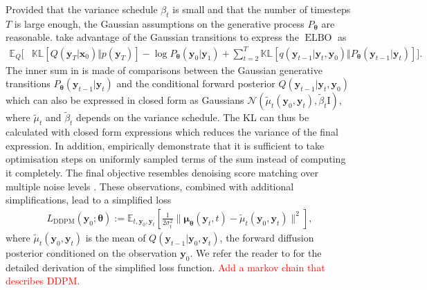 Provided that the variance schedule $\beta_t$ is small and that the number of timesteps $T$ is large enough, the Gaussian assumptions on the generative process $P_{\bm{\theta}}$ are reasonable. \citet{ho_denoising_2020} take advantage of the Gaussian transitions to express the $\operatorname{ELBO}$ as
\begin{align}
        \mathbb{E}_Q \biggl[& \mathbb{KL}\left[Q(\mathbf{y}_T|\mathbf{x}_0)\Vert p(\mathbf{y}_T)\right] - \log P_{\bm{\theta}}(\mathbf{y}_0|\mathbf{y}_1) + \sum_{t=2}^T \mathbb{KL}\left[q(\mathbf{y}_{t-1}|\mathbf{y}_t, \mathbf{y}_0)\Vert P_{\bm{\theta}}(\mathbf{y}_{t-1}|\mathbf{y}_t)\right]
     \biggr]. \label{eq:simple_DDPM_ELBO}
\end{align}
The inner sum in  is made of comparisons between the Gaussian generative transitions $P_{\bm{\theta}}(\mathbf{y}_{t-1}|\mathbf{y}_t)$ and the conditional forward posterior $Q(\mathbf{y}_{t-1}|\mathbf{y}_t, \mathbf{y}_0)$ which can also be expressed in closed form as Gaussians $\mathcal{N}(\tilde{\mu}_t(\mathbf{y}_0, \mathbf{y}_t), \tilde{\beta}_t \text{I})$, where $\tilde{\mu}_t$ and $\tilde{\beta}_t$ depends on the variance schedule. The KL can thus be calculated with closed form expressions which reduces the variance of the final expression.
In addition, \citet{ho_denoising_2020} empirically demonstrate that it is sufficient to take optimisation steps on uniformly sampled terms of the sum instead of computing it completely. The final objective resembles denoising score matching over multiple noise levels \citep{vincent2011connection}. These observations, combined with additional simplifications, lead to a simplified loss
\begin{align}
    L_\text{DDPM}(\mathbf{y}_0; \bm{\theta}) := \mathbb{E}_{t, \mathbf{y}_0, \mathbf{y}_t}\left[ \frac{1}{2\sigma^2_t}\lVert \mathbf{\mu}_{\bm{\theta}}(\mathbf{y}_t, t) - \tilde{\mu}_t(\mathbf{y}_0, \mathbf{y}_t)  \rVert^2\right],
\end{align}
where $\tilde{\mu}_t(\mathbf{y}_0, \mathbf{y}_t)$ is the mean of $Q(\mathbf{y}_{t-1}|\mathbf{y}_{0}, \mathbf{y}_{t})$, the forward diffusion posterior conditioned on the observation $\mathbf{y}_{0}$. We refer the reader to \citet{ho_denoising_2020} for the detailed derivation of the simplified loss function.
\textcolor{red}{Add a markov chain that describes DDPM.}

